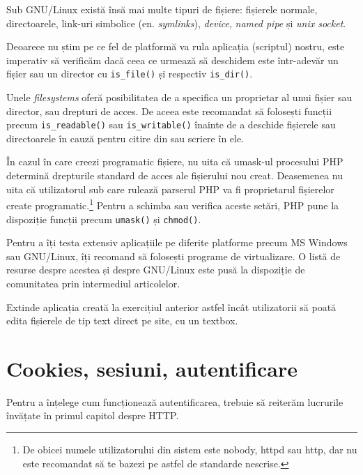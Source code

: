 Sub GNU/Linux există însă mai multe tipuri de {\glqq}fișiere{\grqq}:
fișierele normale, directoarele, link-uri simbolice (en. \textsl{symlinks}),
\textsl{device}, \textsl{named pipe} și \textsl{unix socket}.

Deoarece nu știm pe ce fel de platformă va rula aplicația (scriptul)
nostru, este imperativ să verificăm dacă ceea ce urmează să deschidem
este \^intr-adevăr un fișier sau un director cu \texttt{is\_file()}
și respectiv \texttt{is\_dir()}.

Unele \textit{filesystems} oferă posibilitatea de a specifica 
un proprietar al unui fișier sau director, sau drepturi de acces.
De aceea este recomandat să folosești funcții precum \texttt{is\_readable()}
sau \texttt{is\_writable()} \^inainte de a deschide fișierele
sau directoarele \^in cauză pentru citire din sau scriere \^in ele.

\^In cazul \^in care creezi programatic fișiere, nu uita că
umask-ul procesului PHP determină drepturile standard de acces
ale fișierului nou creat. Deasemenea nu uita că utilizatorul sub
care rulează parserul PHP va fi proprietarul fișierelor create
programatic.\footnote{De obicei numele utilizatorului din sistem
este {\glqq}nobody{\grqq}, {\glqq}httpd{\grqq} sau {\glqq}http{\grqq}, dar
nu este recomandat să te bazezi pe astfel de standarde nescrise.}
Pentru a schimba sau verifica aceste setări, PHP pune la dispoziție
funcții precum \texttt{umask()} și \texttt{chmod()}.

Pentru a \^iți testa extensiv aplicațiile pe diferite platforme
precum MS Windows sau GNU/Linux, \^iți recomand să folosești
programe de virtualizare. O listă de resurse despre acestea
și despre GNU/Linux este pusă la dispoziție de comunitatea
{\phpro} prin intermediul articolelor.


\begin{Exercise}[title={Remote file storage cu editare text on-site},difficulty=1]
Extinde aplicația creată la exercițiul anterior astfel încât
utilizatorii să poată edita fișierele de tip text direct
pe site, cu un textbox.
\end{Exercise}

\section{Cookies, sesiuni, autentificare}
Pentru a \^ințelege cum funcționează autentificarea, trebuie să
reiterăm lucrurile \^invățate \^in primul capitol despre HTTP.


